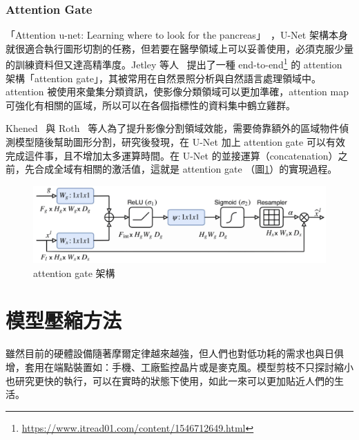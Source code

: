 \subsubsection{Attention Gate}
「Attention u-net: Learning where to look for the pancreas」~\cite{oktay2018attention}，U-Net 架構本身就很適合執行圖形切割的任務，但若要在醫學領域上可以妥善使用，必須克服少量的訓練資料但又達高精準度。Jetley 等人~\cite{jetley2018learn} 提出了一種 end-to-end\footnote{\url{https://www.itread01.com/content/1546712649.html}} 的 attention 架構「attention gate」，其被常用在自然景照分析與自然語言處理領域中。attention 被使用來彙集分類資訊，使影像分類領域可以更加準確，attention map 可強化有相關的區域，所以可以在各個指標性的資料集中鶴立雞群。

Khened~\cite{khened2019fully} 與 Roth~\cite{roth2018spatial} 等人為了提升影像分割領域效能，需要倚靠額外的區域物件偵測模型隨後幫助圖形分割，研究後發現，在 U-Net 加上 attention gate 可以有效完成這件事，且不增加太多運算時間。在 U-Net 的並接運算（concatenation）之前，先合成全域有相關的激活值，這就是 attention gate （圖\ref{attention_gate1}）的實現過程。
\begin{figure}[htbp]
    \hfil
    \begin{minipage}[t]{0.8\textwidth}
        \includegraphics[width=\textwidth]{./figures/chapter02_method/attention_gate1.png}
        \caption {attention gate 架構}
        \label{attention_gate1}
    \end{minipage}
    \hfil
\end{figure}


\section{模型壓縮方法}
雖然目前的硬體設備隨著摩爾定律越來越強，但人們也對低功耗的需求也與日俱增，套用在端點裝置如：手機、工廠監控晶片或是麥克風。模型剪枝不只探討縮小也研究更快的執行，可以在實時的狀態下使用，如此一來可以更加貼近人們的生活。


